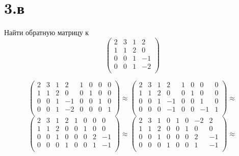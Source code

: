 \documentclass[a4paper]{article}
\begin{document}
\section*{3.в}
Найти обратную матрицу к 
\begin{equation*}
\begin{pmatrix}
2 & 3 & 1 & 2\\
1 & 1 & 2 & 0\\
0 & 0 & 1 & -1\\
0 & 0 & 1 & -2\\
\end{pmatrix}
\end{equation*}

\begin{equation*}
 \left(\begin{array}{rrrr|rrrr}
 2 & 3 & 1 & 2 & 1 & 0 & 0 & 0\\
1 & 1 & 2 & 0 & 0 & 1 & 0 & 0\\
0 & 0 & 1 & -1 & 0 & 0 & 1 & 0\\
0 & 0 & 1 & -2 & 0 & 0 & 0 & 1\\
   \end{array}\right)
   \approx
 \left(\begin{array}{rrrr|rrrr}
 2 & 3 & 1 & 2 & 1 & 0 & 0 & 0\\
1 & 1 & 2 & 0 & 0 & 1 & 0 & 0\\
0 & 0 & 1 & -1 & 0 & 0 & 1 & 0\\
0 & 0 & 0 & -1 & 0 & 0 & -1 & 1\\
   \end{array}\right)
\approx
\end{equation*}
\begin{equation*}
  \left(\begin{array}{rrrr|rrrr}
 2 & 3 & 1 & 2 & 1 & 0 & 0 & 0\\
1 & 1 & 2 & 0 & 0 & 1 & 0 & 0\\
0 & 0 & 1 & 0 & 0 & 0 & 2 & -1\\
0 & 0 & 0 & 1 & 0 & 0 & 1 & -1\\
   \end{array}\right)
   \approx
  \left(\begin{array}{rrrr|rrrr}
2 & 3 & 1 & 0 & 1 & 0 & -2 & 2\\
1 & 1 & 2 & 0 & 0 & 1 & 0 & 0\\
0 & 0 & 1 & 0 & 0 & 0 & 2 & -1\\
0 & 0 & 0 & 1 & 0 & 0 & 1 & -1\\
   \end{array}\right)
\approx
\end{equation*}
\end{document}
